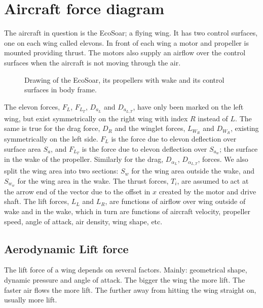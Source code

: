 
\section{Aircraft force diagram}
The aircraft in question is the EcoSoar; a flying wing.
It has two control surfaces, one on each wing called elevons.
In front of each wing a motor and propeller is mounted providing thrust.
The motors also supply an airflow over the control surfaces when the aircraft is not moving through the air.


\begin{figure}[h]
    \center
    \begin{tikzpicture}
    
    \end{tikzpicture}
    \caption{Drawing of the EcoSoar, its propellers with wake and its control surfaces in body frame.}
    \label{airplane}
\end{figure}

The elevon forces, $F_L$, $F_{L_T}$, $D_{a_{L}}$ and $D_{a_{L,T}}$, have only been marked on the left wing, but exist symmetrically on the right wing with index $R$ instead of $L$.
The same is true for the drag force, $D_R$ and the winglet forces, $L_{W_R}$ and $D_{W_R}$, existing symmetrically on the left side.
$F_L$ is the force due to elevon deflection over surface area $S_a$, and $F_{L_T}$ is the force due to elevon deflection over $S_{a_w}$; the surface in the wake of the propeller.
Similarly for the drag, $D_{\alpha_L}$, $D_{\alpha_{L,T}}$, forces.
We also split the wing area into two sections: $S_w$ for the wing area outside the wake, and $S_{w_w}$ for the wing area in the wake.
The thrust forces, $T_i$, are assumed to act at the arrow end of the vector due to the offset in $x$ created by the motor and drive shaft.
The lift forces, $L_L$ and $L_R$, are functions of airflow over wing outside of wake and in the wake, which in turn are functions of aircraft velocity, propeller speed, angle of attack, air density, wing shape, etc.



\subsection{Aerodynamic Lift force}

The lift force of a wing depends on several factors.
Mainly: geometrical shape, dynamic pressure and angle of attack.
The bigger the wing the more lift.
The faster air flows the more lift.
The further away from hitting the wing straight on, usually more lift.

